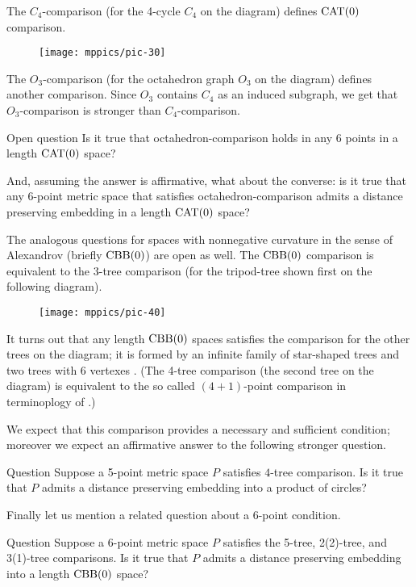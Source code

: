 \documentclass{article}
\begin{document}
The $C_4$-comparison (for the 4-cycle $C_4$ on the diagram) defines $\mathrm{CAT}(0)$ comparison.
\begin{figure}[h!]
\vskip-0mm
\centering
\texttt{[image: mppics/pic-30]}
\end{figure}
The $O_3$-comparison (for the octahedron graph $O_3$ on the diagram) defines another comparison.
Since $O_3$ contains $C_4$ as an induced subgraph, we get that $O_3$-comparison is stronger than $C_4$-comparison.

\begin{thm}{Open question}
Is it true that octahedron-comparison holds in any 6 points in a length $\mathrm{CAT}(0)$ space?

And, assuming the answer is affirmative, what about the converse: is it true that any 6-point metric space that satisfies octahedron-comparison admits a distance preserving embedding in a length $\mathrm{CAT}(0)$ space?
\end{thm}


The analogous questions for  spaces with nonnegative curvature in the sense of Alexandrov (briefly $\mathrm{CBB}(0)$) are open as well.
The $\mathrm{CBB}(0)$ comparison is equivalent to the $3$-tree comparison (for the tripod-tree shown first on the following diagram).
\begin{figure}[h!]
\vskip-0mm
\centering
\texttt{[image: mppics/pic-40]}
\end{figure}
It turns out that any length $\mathrm{CBB}(0)$ spaces satisfies the comparison for the other trees on the diagram; it is formed by an infinite family of star-shaped trees and two trees with 6 vertexes \cite{alexander-kapovitch-petrunin-2011,lebedeva-petrunin-zolotov}.
(The 4-tree comparison (the second tree on the diagram) is equivalent to the so called $(4{+}1)$-point comparison in terminoplogy of \cite{alexander-kapovitch-petrunin-2011}.)

We expect that this comparison provides a necessary and sufficient condition; moreover we expect an affirmative answer to the following stronger question.


\begin{thm}{Question}
Suppose a 5-point metric space $P$ satisfies $4$-tree comparison.
Is it true that $P$ admits a distance preserving embedding into a product of circles?
\end{thm}

Finally let us mention a related question about a 6-point condition. 

\begin{thm}{Question}
Suppose a 6-point metric space $P$ satisfies the 5-tree, 2(2)-tree, and 3(1)-tree comparisons.
Is it true that $P$ admits a distance preserving embedding into a length $\mathrm{CBB}(0)$ space?
\end{thm}

{\sloppy
\printbibliography[heading=bibintoc]
\fussy
}
\end{document}
